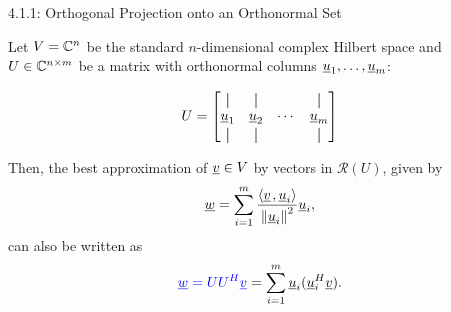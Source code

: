 \documentclass[10pt,letterpaper,english]{beamer}
\begin{document}
\begin{frame}{4.1.1: Orthogonal Projection onto an Orthonormal Set}

Let $V = \mathbb{C}^n$ be the standard $n$-dimensional complex Hilbert space and $U \in \mathbb{C}^{n\times m}$ be a matrix with orthonormal columns $\underline{u}_1,\ldots,\underline{u}_m$:

\[ U = \begin{bmatrix} \vertbar & \vertbar & & \vertbar \\ \vecnot{u}_1 & \vecnot{u}_2 & \cdots & \vecnot{u}_m \\ \vertbar & \vertbar & & \vertbar \end{bmatrix} \]

\vspace{4mm}

Then, the best approximation of $\underline{v}\in V$ by vectors in $\mathcal{R}(U)$, given by
\begin{equation*}
\underline{w} = \sum_{i=1}^m \frac{ {\left\langle  \underline{v}  \mskip2mu ,  \underline{u}_i  \right\rangle} }{ \left\| \underline{u}_i \right\|^2 } \underline{u}_i,
\end{equation*}
can also be written as
\[ {\color{blue}\underline{w} = U U^H \underline{v}} = \sum_{i=1}^m \underline{u}_i (\underline{u}_i^H \underline{v}). \]

\end{frame}
\end{document}
